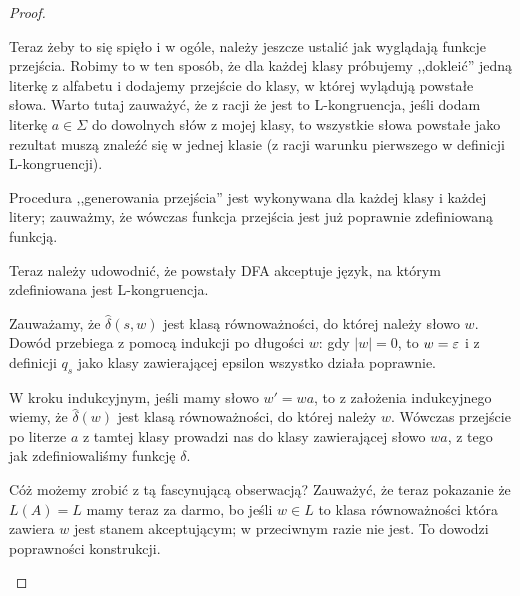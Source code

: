 \begin{proof}
\begin{description}
        Teraz żeby to się spięło i w ogóle, należy jeszcze ustalić jak wyglądają funkcje przejścia. Robimy to w ten sposób, że dla każdej klasy próbujemy ,,dokleić'' jedną literkę z alfabetu i dodajemy przejście do klasy, w której wylądują powstałe słowa. Warto tutaj zauważyć, że z racji że jest to L-kongruencja, jeśli dodam literkę \(a \in \Sigma \) do dowolnych słów z mojej klasy, to wszystkie słowa powstałe jako rezultat muszą znaleźć się w jednej klasie (z racji warunku pierwszego w definicji L-kongruencji). 
        
        Procedura ,,generowania przejścia'' jest wykonywana dla każdej klasy i każdej litery; zauważmy, że wówczas funkcja przejścia jest już poprawnie zdefiniowaną funkcją. 
        
        Teraz należy udowodnić, że powstały DFA akceptuje język, na którym zdefiniowana jest L-kongruencja. 
        
        Zauważamy, że \(\hat\delta(s, w) \) jest klasą równoważności, do której należy słowo \(w\). Dowód przebiega z pomocą indukcji po długości \(w\): gdy \(|w| = 0\), to \( w = \varepsilon \) i z definicji \(q_s\) jako klasy zawierającej epsilon wszystko działa poprawnie.
        
        W kroku indukcyjnym, jeśli mamy słowo \(w' = wa\), to z założenia indukcyjnego wiemy, że \(\hat\delta(w)\) jest klasą równoważności, do której należy \(w\). Wówczas przejście po literze \(a\) z tamtej klasy prowadzi nas do klasy zawierającej słowo \(wa\), z tego jak zdefiniowaliśmy funkcję \(\delta\). 
        
        Cóż możemy zrobić z tą fascynującą obserwacją? Zauważyć, że teraz pokazanie że \(L(A) = L\) mamy teraz za darmo, bo jeśli \(w \in L\) to klasa równoważności która zawiera \(w\) jest stanem akceptującym; w przeciwnym razie nie jest. To dowodzi poprawności konstrukcji. 
        
        
    \end{description}
\end{proof}